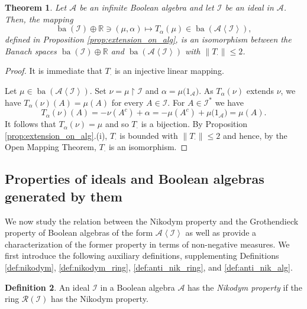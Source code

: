 \documentclass[a4paper,11pt,fleqn]{amsart}
\newtheorem{theorem}{Theorem}[section]
\theoremstyle{definition}
\newtheorem{definition}[theorem]{Definition}
\theoremstyle{remark}
\numberwithin{equation}{section}
\newcommand{\R}{\mathbb{R}}
\newcommand{\aA}{\mathcal{A}}
\newcommand{\iI}{\mathcal{I}}
\newcommand{\rR}{\mathcal{R}}
\DeclareMathOperator{\ba}{ba}
\newcommand{\rstr}{\restriction}
\newcommand{\gen}[1]{\mathopen{}\left\langle#1\mathclose{}\right\rangle}
\begin{document}
\begin{theorem}\label{thm:isomorphism}
    Let $\aA$ be an infinite Boolean algebra and let $\iI$ be an ideal in $\aA$. Then, the mapping
    \[\ba(\iI)\oplus\R\ni(\mu,\alpha)\longmapsto T_\alpha(\mu)\in\ba(\aA\gen{\iI}),\]
    defined in Proposition \ref{prop:extension_on_alg}, is an isomorphism between the Banach spaces $\ba(\iI)\oplus\R$ and $\ba(\aA\gen{\iI})$ with $\|T_\cdot\|\le2$.
\end{theorem}
\begin{proof}
    It is immediate that $T_\cdot$ is an injective linear mapping.

    Let $\mu\in\ba(\aA\gen{\iI})$. Set $\nu=\mu\rstr\iI$ and $\alpha=\mu\big(1_\aA\big)$. As $T_\alpha(\nu)$ extends $\nu$, we have $T_\alpha(\nu)(A)=\mu(A)$ for every $A\in\iI$. For $A\in\iI^*$ we have
    \[T_\alpha(\nu)(A)=-\nu(A^c)+\alpha=-\mu(A^c)+\mu\big(1_\aA\big)=\mu(A).\]
    It follows that $T_\alpha(\nu)=\mu$ and so $T_\cdot$ is a bijection. By Proposition \ref{prop:extension_on_alg}.(i), $T_\cdot$ is bounded with $\|T_\cdot\|\le2$ and hence, by the Open Mapping Theorem, $T_\cdot$ is an isomorphism.
\end{proof}

\subsection{Properties of ideals and Boolean algebras generated by them\label{sec:ideals_prop}}

We now study the relation between the Nikodym property and the Grothendieck property of Boolean algebras of the form $\aA\gen{\iI}$ as well as provide a characterization of the former property in terms of non-negative measures. We first introduce the following auxiliary definitions, supplementing Definitions \ref{def:nikodym}, \ref{def:nikodym_ring}, \ref{def:anti_nik_ring}, and \ref{def:anti_nik_alg}.

\begin{definition}\label{def:nik_ideal}
An ideal $\iI$ in a Boolean algebra $\aA$ has the \textit{Nikodym property} if the ring $\rR(\iI)$ has the Nikodym property.
\end{definition}
\end{document}
